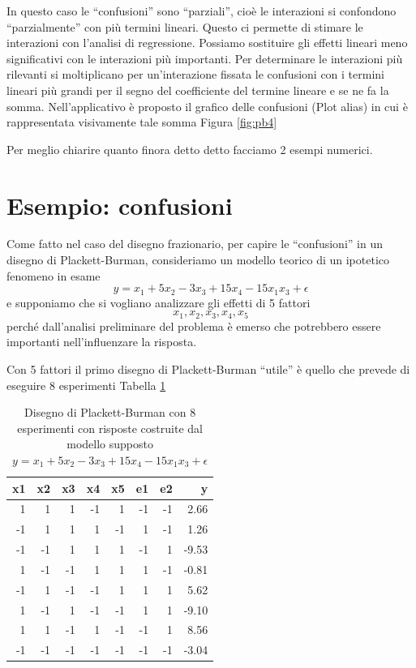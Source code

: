 \documentclass[
  11pt,
]{book}
\begin{document}
In questo caso le ``confusioni'' sono ``parziali'', cioè le interazioni si confondono ``parzialmente'' con più termini lineari. Questo ci permette di stimare le interazioni con l'analisi di regressione. Possiamo sostituire gli effetti lineari meno significativi con le interazioni più importanti. Per determinare le interazioni più rilevanti si moltiplicano per un'interazione fissata le confusioni con i termini lineari più grandi per il segno del coefficiente del termine lineare e se ne fa la somma. Nell'applicativo è proposto il grafico delle confusioni (Plot alias) in cui è rappresentata visivamente tale somma Figura \ref{fig:pb4}

Per meglio chiarire quanto finora detto detto facciamo 2 esempi numerici.

\hypertarget{esempio-confusioni-1}{%
\section{Esempio: confusioni}\label{esempio-confusioni-1}}

Come fatto nel caso del disegno frazionario, per capire le ``confusioni'' in un disegno di Plackett-Burman, consideriamo un modello teorico di un ipotetico fenomeno in esame
\[
y=x_1+5x_2-3x_3+15x_4-15x_1x_3+\epsilon
\]
e supponiamo che si vogliano analizzare gli effetti di 5 fattori
\[
x_1,x_2,x_3,x_4,x_5
\]
perché dall'analisi preliminare del problema è emerso che potrebbero essere importanti nell'influenzare la risposta.

Con 5 fattori il primo disegno di Plackett-Burman ``utile'' è quello che prevede di eseguire 8 esperimenti Tabella \ref{tab:pbes1}

\begin{table}

\caption{\label{tab:pbes1}Disegno di Plackett-Burman con 8 esperimenti con risposte costruite dal modello supposto
            $y=x_1+5x_2-3x_3+15x_4-15x_1x_3+\epsilon$ }
\centering
\begin{tabular}[t]{r|r|r|r|r|r|r|r}
\hline
x1 & x2 & x3 & x4 & x5 & e1 & e2 & y\\
\hline
1 & 1 & 1 & -1 & 1 & -1 & -1 & 2.66\\
\hline
-1 & 1 & 1 & 1 & -1 & 1 & -1 & 1.26\\
\hline
-1 & -1 & 1 & 1 & 1 & -1 & 1 & -9.53\\
\hline
1 & -1 & -1 & 1 & 1 & 1 & -1 & -0.81\\
\hline
-1 & 1 & -1 & -1 & 1 & 1 & 1 & 5.62\\
\hline
1 & -1 & 1 & -1 & -1 & 1 & 1 & -9.10\\
\hline
1 & 1 & -1 & 1 & -1 & -1 & 1 & 8.56\\
\hline
-1 & -1 & -1 & -1 & -1 & -1 & -1 & -3.04\\
\hline
\end{tabular}
\end{table}
\end{document}
